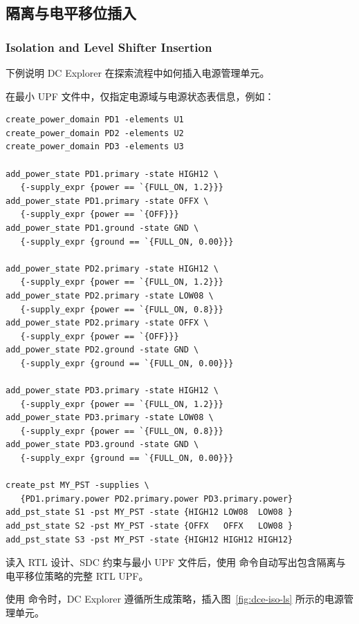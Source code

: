 \subsection{隔离与电平移位插入}
\subsubsection*{Isolation and Level Shifter Insertion}

下例说明 DC Explorer 在探索流程中如何插入电源管理单元。

在最小 UPF 文件中，仅指定电源域与电源状态表信息，例如：
\begin{lstlisting}
create_power_domain PD1 -elements U1
create_power_domain PD2 -elements U2
create_power_domain PD3 -elements U3

add_power_state PD1.primary -state HIGH12 \
   {-supply_expr {power == `{FULL_ON, 1.2}}}
add_power_state PD1.primary -state OFFX \
   {-supply_expr {power == `{OFF}}}
add_power_state PD1.ground -state GND \
   {-supply_expr {ground == `{FULL_ON, 0.00}}}

add_power_state PD2.primary -state HIGH12 \
   {-supply_expr {power == `{FULL_ON, 1.2}}}
add_power_state PD2.primary -state LOW08 \
   {-supply_expr {power == `{FULL_ON, 0.8}}}
add_power_state PD2.primary -state OFFX \
   {-supply_expr {power == `{OFF}}}
add_power_state PD2.ground -state GND \
   {-supply_expr {ground == `{FULL_ON, 0.00}}}

add_power_state PD3.primary -state HIGH12 \
   {-supply_expr {power == `{FULL_ON, 1.2}}}
add_power_state PD3.primary -state LOW08 \
   {-supply_expr {power == `{FULL_ON, 0.8}}}
add_power_state PD3.ground -state GND \
   {-supply_expr {ground == `{FULL_ON, 0.00}}}

create_pst MY_PST -supplies \
   {PD1.primary.power PD2.primary.power PD3.primary.power}
add_pst_state S1 -pst MY_PST -state {HIGH12 LOW08  LOW08 }
add_pst_state S2 -pst MY_PST -state {OFFX   OFFX   LOW08 }
add_pst_state S3 -pst MY_PST -state {HIGH12 HIGH12 HIGH12}
\end{lstlisting}

读入 RTL 设计、SDC 约束与最小 UPF 文件后，使用  命令自动写出包含隔离与电平移位策略的完整 RTL UPF。

使用 \cmd{compile\_exploration} 命令时，DC Explorer 遵循所生成策略，插入图~\ref{fig:dce-iso-ls} 所示的电源管理单元。


